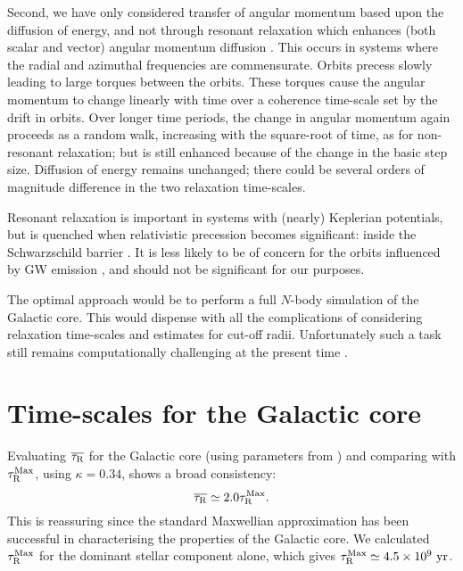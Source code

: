 Second, we have only considered transfer of angular momentum based upon the diffusion of energy, and not through resonant relaxation which enhances (both scalar and vector) angular momentum diffusion \citep{Rauch1996,Rauch1998,Gurkan2007,Eilon2009,Madigan2011}. This occurs in systems where the radial and azimuthal frequencies are commensurate. Orbits precess slowly leading to large torques between the orbits. These torques cause the angular momentum to change linearly with time over a coherence time-scale set by the drift in orbits. Over longer time periods, the change in angular momentum again proceeds as a random walk, increasing with the square-root of time, as for non-resonant relaxation; but is still enhanced because of the change in the basic step size. Diffusion of energy remains unchanged; there could be several orders of magnitude difference in the two relaxation time-scales.

Resonant relaxation is important in systems with (nearly) Keplerian potentials, but is quenched when relativistic precession becomes significant: inside the Schwarzschild barrier \citep{Merritt2011}. It is less likely to be of concern for the orbits influenced by GW emission \citep{Sigurdsson1997}, and should not be significant for our purposes.

The optimal approach would be to perform a full $N$-body simulation of the Galactic core. This would dispense with all the complications of considering relaxation time-scales and estimates for cut-off radii. Unfortunately such a task still remains computationally challenging at the present time \citep[e.g.,][]{Li2012}.

\section{Time-scales for the Galactic core}\label{sec:tauGC}

Evaluating $\overline{\tau_\mathrm{R}}$ for the Galactic core (using parameters from ) and comparing with $\tau_\mathrm{R}^\mathrm{Max}$,  using $\kappa = 0.34$, shows a broad consistency:
\begin{equation}
\overline{\tau_\mathrm{R}} \simeq 2.0 \tau_\mathrm{R}^\mathrm{Max}.
\end{equation}
This is reassuring since the standard Maxwellian approximation has been successful in characterising the properties of the Galactic core. We calculated $\tau_\mathrm{R}^\mathrm{Max}$ for the dominant stellar component alone, which gives $\tau_\mathrm{R}^\mathrm{Max}\simeq 4.5 \times 10^9~\mathrm{yr}$.

